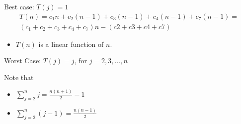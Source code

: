 \documentclass{beamer}
\begin{document}
\begin{frame}{Best case: $T(j) = 1$}
  \begin{multline*}
    T(n)  =  c_1n + c_2(n-1) + c_3(n-1) + c_4(n-1) + c_7(n-1) = \\
             (c_1 + c_2 + c_3 + c_4 + c_7)n - (c2 + c3 + c4 + c7) 
  \end{multline*}

  \pause
  
  \begin{itemize}
    \item $T(n)$ is a linear function of $n$.
  \end{itemize}

\end{frame}

\begin{frame}{Worst Case: $T(j) = j$, for $j=2, 3, \ldots, n$}

  \begin{block}{Note that}
    \begin{itemize}

      \item $\sum_{j=2}^{n}j = \frac{n(n+1)}{2}-1$

      \item $\sum_{j=2}^{n}(j-1) = \frac{n(n-1)}{2}$
      
    \end{itemize}
  \end{block}

\end{frame}
\end{document}
